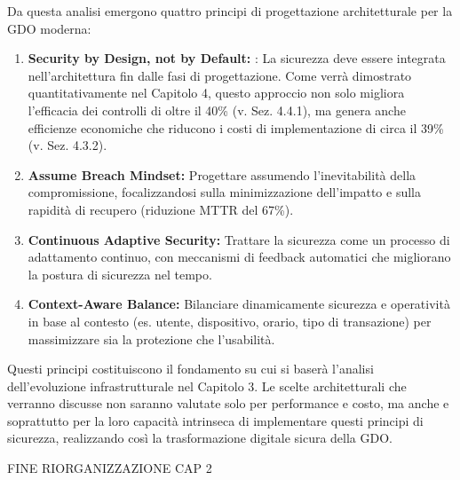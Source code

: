 Da questa analisi emergono quattro principi di progettazione architetturale per la GDO moderna:
\begin{enumerate}
    \item \textbf{Security by Design, not by Default: }: La sicurezza deve essere integrata nell'architettura fin dalle fasi di progettazione. Come verrà dimostrato quantitativamente nel Capitolo 4, questo approccio non solo migliora l'efficacia dei controlli di oltre il 40\% (v. Sez. 4.4.1), ma genera anche efficienze economiche che riducono i costi di implementazione di circa il 39\% (v. Sez. 4.3.2).
 
    \item \textbf{Assume Breach Mindset:} Progettare assumendo l'inevitabilità della compromissione, focalizzandosi sulla minimizzazione dell'impatto e sulla rapidità di recupero (riduzione MTTR del 67\%).
   
    \item \textbf{Continuous Adaptive Security:} Trattare la sicurezza come un processo di adattamento continuo, con meccanismi di feedback automatici che migliorano la postura di sicurezza nel tempo.
 
    \item \textbf{Context-Aware Balance:} Bilanciare dinamicamente sicurezza e operatività in base al contesto (es. utente, dispositivo, orario, tipo di transazione) per massimizzare sia la protezione che l'usabilità.
\end{enumerate}

Questi principi costituiscono il fondamento su cui si baserà l'analisi dell'evoluzione infrastrutturale nel Capitolo 3. Le scelte architetturali che verranno discusse non saranno valutate solo per performance e costo, ma anche e soprattutto per la loro capacità intrinseca di implementare questi principi di sicurezza, realizzando così la trasformazione digitale sicura della GDO.

FINE RIORGANIZZAZIONE CAP 2
\clearpage
\printbibliography[
    heading=subbibliography, %
    title={Riferimenti Bibliografici del Capitolo 2}, %
]

\endrefsection













